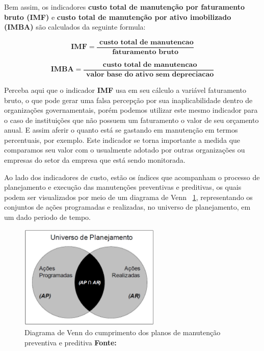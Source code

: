 Bem assim, os indicadores \textbf{custo total de manutenção por faturamento bruto (IMF)} e \textbf{custo total de manutenção por ativo imobilizado (IMBA)} são calculados da seguinte formula: 

\begin{equation}
\label{eqn03}
	\mathbf{IMF} = \mathbf{\frac{\textrm{ custo total de manutencao}}{\textrm{faturamento bruto}}} 
\end{equation}

\begin{equation}
\label{eqn04}
	\mathbf{IMBA} = \mathbf{\frac{\textrm{ custo total de manutencao}}{\textrm{ valor base do ativo sem depreciacao}}} 
\end{equation}

Perceba aqui que o indicador \textbf{IMF} usa em seu cálculo a variável faturamento bruto, o que pode gerar uma falsa percepção por sua inaplicabilidade dentro de organizações governamentais, porém podemos utilizar este mesmo indicador para o caso de instituições que não possuem um faturamento o valor de seu orçamento anual. E assim aferir o quanto está se gastando em manutenção em termos percentuais, por exemplo. Este indicador se torna importante a medida que comparamos seu valor com o usualmente adotado por outras organizações ou empresas do setor da empresa que está sendo monitorada.

Ao lado dos indicadores de custo, estão os índices que acompanham o processo de planejamento e execução das manutenções preventivas e preditivas, os quais podem ser visualizados por meio de um diagrama de Venn ~\ref{Diagrama de Venn da programacao}, representando os conjuntos de ações programadas e realizadas, no universo de planejamento, em um dado periodo de tempo. 

\graphicspath{{figuras/}}
\begin{figure}[H]
\centering
\includegraphics[width=0.6\textwidth]{Diagrama_de_Venn.eps}
\caption{Diagrama de Venn do cumprimento dos planos de manutenção preventiva e preditiva \textbf{Fonte:\cite{de2006indicadores}}}
\label{Diagrama de Venn da programacao}
\end{figure}

